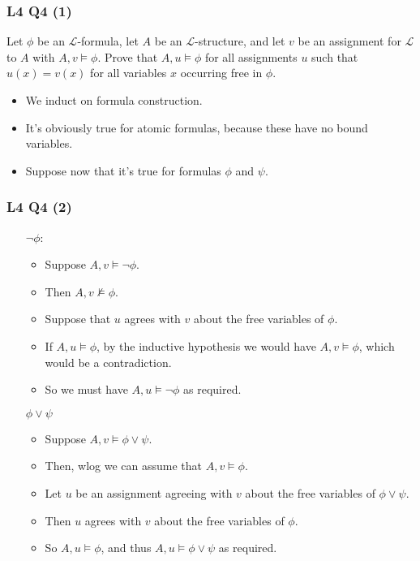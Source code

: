 \documentclass[handout]{beamer}
\newcommand{\sL}{\mathscr{L}}
\begin{document}
\begin{frame}
\frametitle{L4 Q4 (1)}
Let $\phi$ be an $\sL$-formula, let $A$ be an $\sL$-structure, and let $v$ be an assignment for $\sL$ to $A$ with $A,v \models \phi$. Prove that $A,u\models \phi$ for all assignments $u$ such that $u(x)= v(x)$ for all variables $x$ occurring free in $\phi$.\vspace{0.5cm}
\vspace{0.5cm}
\begin{itemize}
\item We induct on formula construction. \vspace{0.5cm}
\item It's obviously true for atomic formulas, because these have no bound variables. \vspace{0.5cm}
\item Suppose now that it's true for formulas $\phi$ and $\psi$.
\end{itemize}
\end{frame}

\begin{frame}
\frametitle{L4 Q4 (2)}
\begin{itemize}
\item[$\neg \phi$:]  \begin{itemize}
\item Suppose $A ,v\models \neg \phi$.\vspace{0.1cm} 
\item Then $A, v\not\models \phi$. \vspace{0.1cm} 
\item Suppose that $u$ agrees with $v$ about the free variables of $\phi$. \vspace{0.1cm} 
\item If $A,u\models \phi$, by the inductive hypothesis we would have $A, v\models \phi$, which would be a contradiction. \vspace{0.1cm} 
\item So we must have $A, u\models \neg\phi$ as required.
\end{itemize}\vspace{0.6cm}
\item[$\phi\vee\psi$] \begin{itemize}
\item Suppose $A,v\models \phi\vee\psi$. \vspace{0.1cm} 
\item Then, wlog we can assume that $A,v\models \phi$. \vspace{0.1cm} 
\item Let $u$ be an assignment agreeing with $v$ about the free variables of $\phi\vee\psi$. \vspace{0.1cm} 
\item Then $u$ agrees with $v$ about the free variables of $\phi$. \vspace{0.1cm} 
\item So $A, u\models \phi$, and thus $A,u\models \phi\vee\psi$ as required.
\end{itemize}
\end{itemize}
\end{frame}
\end{document}
